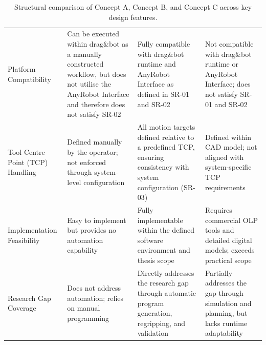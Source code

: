 \begin{landscape}
\begin{table}[htbp]
\begin{tabularx}{\linewidth}{L{3.6cm} L{5.1cm} L{6.8cm} L{5.8cm}}
Platform Compatibility &
Can be executed within drag\&bot as a manually constructed workflow, but does not utilise the AnyRobot Interface and therefore does not satisfy SR-02 &
Fully compatible with drag\&bot runtime and AnyRobot Interface as defined in SR-01 and SR-02 \cite{dragandbot_anyrobot_2025} &
Not compatible with drag\&bot runtime or AnyRobot Interface; does not satisfy SR-01 and SR-02 \\
 
Tool Centre Point (TCP) Handling &
Defined manually by the operator; not enforced through system-level configuration &
All motion targets defined relative to a predefined TCP, ensuring consistency with system configuration (SR-03) &
Defined within CAD model; not aligned with system-specific TCP requirements \\
 
Implementation Feasibility &
Easy to implement but provides no automation capability &
Fully implementable within the defined software environment and thesis scope &
Requires commercial OLP tools and detailed digital models; exceeds practical scope \cite{Siciliano2016Robotics} \\
 
Research Gap Coverage &
Does not address automation; relies on manual programming &
Directly addresses the research gap through automatic program generation, regripping, and validation &
Partially addresses the gap through simulation and planning, but lacks runtime adaptability \\
 
\bottomrule
\end{tabularx}
\caption{Structural comparison of Concept A, Concept B, and Concept C across key design features.}
\label{tab:concept_comparison}
\end{table}
\end{landscape}
